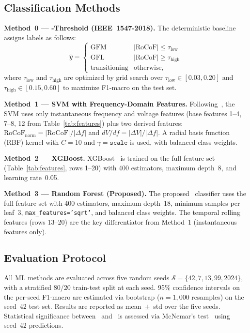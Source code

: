 \documentclass[journal]{IEEEtran}
\newcommand{\rocof}{\text{RoCoF}}
\newcommand{\gfl}{\text{GFL}}
\newcommand{\gfm}{\text{GFM}}
\newcommand{\rf}{\text{RF}}
\newcommand{\xgb}{\text{XGBoost}}
\begin{document}
\subsection{Classification Methods}

\textbf{Method~0 --- \rocof-Threshold (IEEE~1547-2018).}
The deterministic baseline assigns labels as follows:
\begin{equation}
  \hat{y} = \begin{cases}
    \gfm       & |\rocof| \leq \tau_\text{low} \\
    \gfl       & |\rocof| \geq \tau_\text{high} \\
    \text{transitioning} & \text{otherwise},
  \end{cases}
\end{equation}
where $\tau_\text{low}$ and $\tau_\text{high}$ are optimized by
grid search over $\tau_\text{low} \in [0.03, 0.20]$ and
$\tau_\text{high} \in [0.15, 0.60]$ to maximize F1-macro on the test set.

\textbf{Method~1 --- SVM with Frequency-Domain Features.}
Following~\cite{b_svm_islanding}, the SVM uses only instantaneous
frequency and voltage features (base features 1--4, 7--8, 12 from
Table~\ref{tab:features}) plus two derived features:
$\rocof_\text{norm} = |\rocof| / |\Delta f|$ and
$dV/df = |\Delta V| / |\Delta f|$.
A radial basis function (RBF) kernel with $C = 10$ and
$\gamma = \texttt{scale}$ is used, with balanced class weights.

\textbf{Method~2 --- XGBoost.}
XGBoost~\cite{b_xgb_islanding} is trained on the full feature set
(Table~\ref{tab:features}, rows 1--20) with 400 estimators, maximum
depth~8, and learning rate~0.05.

\textbf{Method~3 --- Random Forest (Proposed).}
The proposed \rf\ classifier uses the full feature set with
400 estimators, maximum depth~18, minimum samples per leaf~3,
\texttt{max\_features='sqrt'}, and balanced class weights.
The temporal rolling features (rows 13--20) are the key differentiator
from Method~1 (instantaneous features only).

\subsection{Evaluation Protocol}

All ML methods are evaluated across five random seeds
$\mathcal{S} = \{42, 7, 13, 99, 2024\}$, with a stratified 80/20
train-test split at each seed.
95\% confidence intervals on the per-seed F1-macro are estimated via
bootstrap ($n = 1{,}000$ resamples) on the seed~42 test set.
Results are reported as mean~$\pm$~std over the five seeds.
Statistical significance between \rf\ and \xgb\ is assessed via
McNemar's test~\cite{b_mcnemar} using seed~42 predictions.
\end{document}

